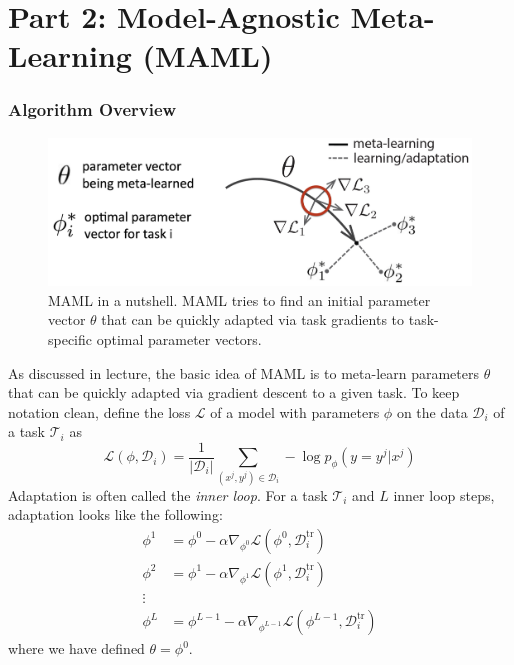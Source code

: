 \documentclass[12pt]{article}
\newcommand{\dataset}{\mathcal{D}}
\newcommand{\task}{\mathcal{T}}
\newcommand{\supportdata}{\mathcal{D}^\mathrm{tr}}
\begin{document}
    \newpage
    \section*{Part 2: Model-Agnostic Meta-Learning (MAML)~\cite{maml}}

    \subsubsection*{Algorithm Overview}

    \begin{figure}[H]
        \centering
        \includegraphics[width=0.8\linewidth]{figures/MAML.png}
        \vspace{-3mm}
        \caption{MAML in a nutshell. MAML tries to find an initial parameter vector $\theta$ that can be quickly adapted via task gradients to task-specific optimal parameter vectors.}
        \label{fig:maml}
    \end{figure}

    As discussed in lecture, the basic idea of MAML is to meta-learn parameters $\theta$ that can be quickly adapted via gradient descent to a given task. To keep notation clean, define the loss $\mathcal{L}$ of a model with parameters $\phi$ on the data $\dataset_i$ of a task $\task_i$ as
    \begin{equation}
        \label{eq:maml loss}
        \mathcal{L}(\phi, \dataset_i) = \frac{1}{\lvert \dataset_i \rvert} \sum_{(x^j, y^j) \in \dataset_i} -\log p_\phi (y = y^j | x^j)
    \end{equation}
    Adaptation is often called the \emph{inner loop}. For a task $\task_i$ and $L$ inner loop steps, adaptation looks like the following:
    \begin{equation}
        \begin{aligned}
            \phi^1 &= \phi^0 - \alpha \nabla_{\phi^0} \mathcal{L}(\phi^0, \supportdata_i) \\
            \phi^2 &= \phi^1 - \alpha \nabla_{\phi^1} \mathcal{L}(\phi^1, \supportdata_i) \\
            \vdots \\
            \phi^L &= \phi^{L-1} - \alpha \nabla_{\phi^{L-1}} \mathcal{L}(\phi^{L-1}, \supportdata_i)
        \end{aligned}
    \end{equation}
    where we have defined $\theta = \phi^0$.
\end{document}
